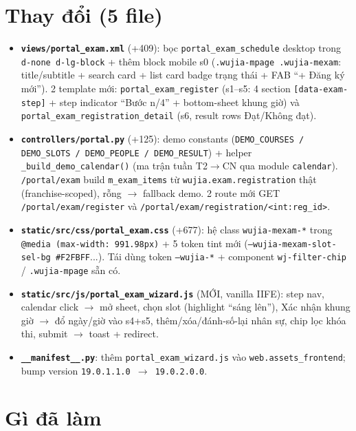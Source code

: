\section{Thay đổi (5 file)}

\begin{itemize}
  \item \textbf{\texttt{views/portal\_exam.xml}} (+409): bọc \texttt{portal\_exam\_schedule} desktop trong \texttt{d-none d-lg-block} + thêm block mobile s0 (\texttt{.wujia-mpage .wujia-mexam}: title/subtitle + search card + list card badge trạng thái + FAB ``+ Đăng ký mới''). 2 template mới: \texttt{portal\_exam\_register} (s1--s5: 4 section \texttt{[data-exam-step]} + step indicator ``Bước n/4'' + bottom-sheet khung giờ) và \texttt{portal\_exam\_registration\_detail} (s6, result rows Đạt/Không đạt).
  \item \textbf{\texttt{controllers/portal.py}} (+125): demo constants (\texttt{DEMO\_COURSES / DEMO\_SLOTS / DEMO\_PEOPLE / DEMO\_RESULT}) + helper \texttt{\_build\_demo\_calendar()} (ma trận tuần T2$\rightarrow$CN qua module \texttt{calendar}). \texttt{/portal/exam} build \texttt{m\_exam\_items} từ \texttt{wujia.exam.registration} thật (franchise-scoped), rỗng $\rightarrow$ fallback demo. 2 route mới GET \texttt{/portal/exam/register} và \texttt{/portal/exam/registration/<int:reg\_id>}.
  \item \textbf{\texttt{static/src/css/portal\_exam.css}} (+677): hệ class \texttt{wujia-mexam-*} trong \texttt{@media (max-width: 991.98px)} + 5 token tint mới (\texttt{--wujia-mexam-slot-sel-bg \#F2FBFF}...). Tái dùng token \texttt{--wujia-*} + component \texttt{wj-filter-chip} / \texttt{.wujia-mpage} sẵn có.
  \item \textbf{\texttt{static/src/js/portal\_exam\_wizard.js}} (MỚI, vanilla IIFE): step nav, calendar click $\rightarrow$ mở sheet, chọn slot (highlight ``sáng lên''), Xác nhận khung giờ $\rightarrow$ đổ ngày/giờ vào s4+s5, thêm/xóa/đánh-số-lại nhân sự, chip lọc khóa thi, submit $\rightarrow$ toast + redirect.
  \item \textbf{\texttt{\_\_manifest\_\_.py}}: thêm \texttt{portal\_exam\_wizard.js} vào \texttt{web.assets\_frontend}; bump version \texttt{19.0.1.1.0 $\rightarrow$ 19.0.2.0.0}.
\end{itemize}

\section{Gì đã làm}

